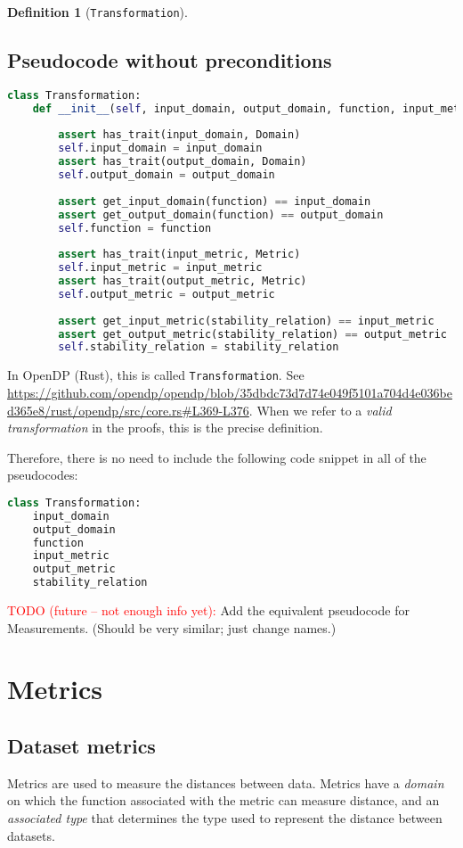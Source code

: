 \documentclass[11pt,a4paper]{article}
\theoremstyle{definition}
\newtheorem{definition}[theorem]{Definition}
\newcommand{\inOpenDPRust}[2]{In OpenDP (Rust), this is called \texttt{#1}. See \url{#2}.}
\newcommand{\todonei}{{\textcolor{red}{TODO (future -- not enough info yet): }}}
\begin{document}
\begin{definition}[\texttt{Transformation}]
\subsection{Pseudocode without preconditions}
\label{sec:pseudocode-wout-preconditions}
\begin{lstlisting}[language=Python]
class Transformation:
    def __init__(self, input_domain, output_domain, function, input_metric, output_metric, stability_relation):
    	
        assert has_trait(input_domain, Domain)
        self.input_domain = input_domain
        assert has_trait(output_domain, Domain)
        self.output_domain = output_domain
        
        assert get_input_domain(function) == input_domain
        assert get_output_domain(function) == output_domain
        self.function = function
        
        assert has_trait(input_metric, Metric)
        self.input_metric = input_metric
        assert has_trait(output_metric, Metric)
        self.output_metric = output_metric
        
        assert get_input_metric(stability_relation) == input_metric
        assert get_output_metric(stability_relation) == output_metric
        self.stability_relation = stability_relation
\end{lstlisting}
    
    \inOpenDPRust{Transformation}{https://github.com/opendp/opendp/blob/35dbdc73d7d74e049f5101a704d4e036bed365e8/rust/opendp/src/core.rs\#L369-L376} When we refer to a \textit{valid transformation} in the proofs, this is the precise definition.
\end{definition}

Therefore, there is no need to include the following code snippet in all of the pseudocodes:
\begin{lstlisting}[language=Python]
class Transformation:
    input_domain
    output_domain
    function
    input_metric
    output_metric
    stability_relation 
\end{lstlisting}

\todonei{Add the equivalent pseudocode for Measurements. (Should be very similar; just change names.)}

\section{Metrics}
\label{sec:metrics}
\subsection{Dataset metrics}
Metrics are used to measure the distances between data. Metrics have a \emph{domain} on which the function associated with the metric can measure distance, and an \emph{associated type} that determines the type used to represent the distance between datasets.
\end{document}
